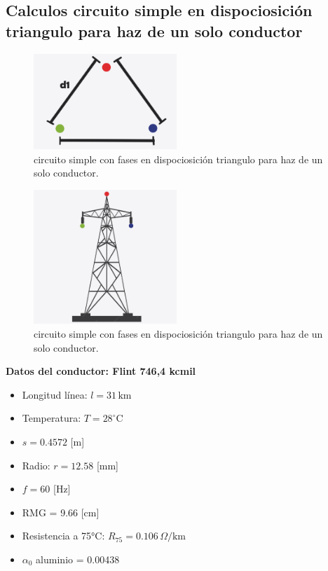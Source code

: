 \subsection{Calculos circuito simple en dispociosición triangulo para haz de un solo conductor}

\begin{figure}[ht!]
    \centering
    \includegraphics[width=0.48\textwidth]{img/Calculos circuito simple en dispociosición triangulo para haz de un solo conductor disp.png}
    \caption{circuito simple con fases en dispociosición triangulo para haz de un solo conductor.}
    \label{fig:circuito_simple_disp}
\end{figure}

\begin{figure}[ht!]
    \centering
    \includegraphics[width=0.48\textwidth]{img/Calculos circuito simple en dispociosición triangulo para haz de un solo conductor.png}
    \caption{circuito simple con fases en dispociosición triangulo para haz de un solo conductor.}
    \label{fig:circuito_simple_Torre}
\end{figure}



\textbf{Datos del conductor: Flint 746,4 kcmil}
\begin{itemize}
  \item Longitud línea: $l = 31 \, \text{km}$
  \item Temperatura: $T = 28^\circ$C
  \item $s = 0.4572$ [m]
  \item Radio: $r = 12.58$ [mm]
  \item $f = 60$ [Hz]
  \item RMG = 9.66 [cm]
  \item Resistencia a 75°C: $R_{75} = 0.106 \, \Omega/\text{km}$
  \item $\alpha_0$ aluminio = 0.00438
\end{itemize}

